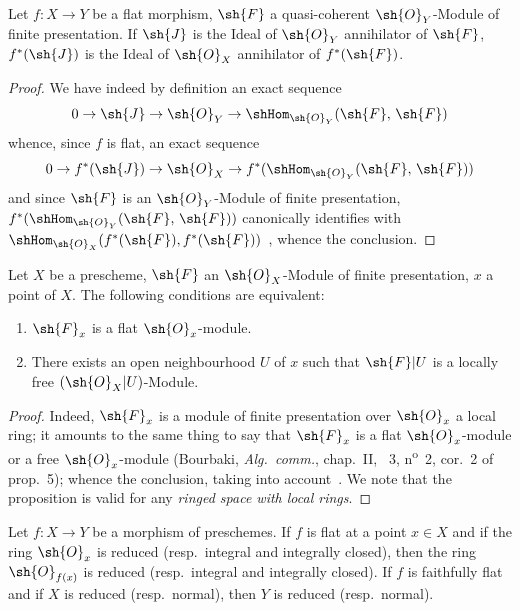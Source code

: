 \begin{proposition}[2.1.11]
\label{IV.2.1.11}
Let $f:X\to Y$ be a flat morphism, $\sh{F}$ a quasi-coherent $\sh{O}_Y$-Module of finite presentation.
If $\sh{J}$ is the Ideal of $\sh{O}_Y$ annihilator of $\sh{F}$, $f^*(\sh{J})$ is the Ideal of $\sh{O}_X$ annihilator of $f^*(\sh{F})$.
\end{proposition}

\begin{proof}
We have indeed by definition an exact sequence~
\[
  0\to\sh{J}\to\sh{O}_Y\to\shHom_{\sh{O}_Y}(\sh{F},\,\sh{F})
\]
whence, since $f$ is flat, an exact sequence
\[
  0\to f^*(\sh{J})\to\sh{O}_X\to f^*(\shHom_{\sh{O}_Y}(\sh{F},\,\sh{F}))
\]
and since $\sh{F}$ is an $\sh{O}_Y$-Module of finite presentation, $f^*(\shHom_{\sh{O}_Y}(\sh{F},\,\sh{F}))$ canonically identifies with $\shHom_{\sh{O}_X}(f^*(\sh{F}),f^*(\sh{F}))$~, whence the conclusion.
\end{proof}

\begin{proposition}[2.1.12]
\label{IV.2.1.12}
Let $X$ be a prescheme, $\sh{F}$ an $\sh{O}_X$-Module of finite presentation, $x$ a point of $X$.
The following conditions are equivalent:
\begin{enumerate}[label=\emph{\alph*)}]
  \item $\sh{F}_x$ is a flat $\sh{O}_x$-module.
  \item There exists an open neighbourhood $U$ of $x$ such that $\sh{F}|U$ is a locally free $(\sh{O}_X|U)$-Module.
\end{enumerate}
\end{proposition}

\begin{proof}
Indeed, $\sh{F}_x$ is a module of finite presentation over $\sh{O}_x$ a local ring; it amounts to the same thing to say that $\sh{F}_x$ is a flat $\sh{O}_x$-module or a free $\sh{O}_x$-module (Bourbaki, \emph{Alg.~comm.}, chap.~II, \textsection~3, n\textsuperscript{o}~2, cor.~2 of prop.~5); whence the conclusion, taking into account~.
We note that the proposition is valid for any \emph{ringed space with local rings}.
\end{proof}

\begin{proposition}[2.1.13]
\label{IV.2.1.13}
Let $f:X\to Y$ be a morphism of preschemes. If $f$ is flat at a point $x\in X$ and if the ring $\sh{O}_x$ is reduced \textnormal{(}resp.\ integral and integrally closed\textnormal{)}, then the ring $\sh{O}_{f(x)}$
is reduced \textnormal{(}resp.\ integral and integrally closed\textnormal{)}.
If $f$ is faithfully flat and if $X$ is reduced \textnormal{(}resp.\ normal\textnormal{)}, then $Y$ is reduced \textnormal{(}resp.\ normal\textnormal{)}.
\end{proposition}

